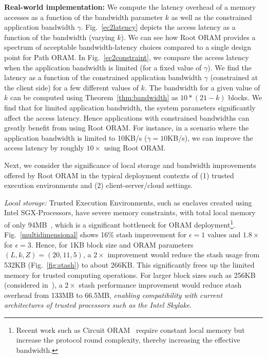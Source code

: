 \documentclass[USenglish,oneside,twocolumn]{article}
\makeatletter
\newcommand{\ourprotocol}{Root ORAM}
\let\origsubsection\subsection
\renewcommand\subsection{\@ifstar{\starsubsection}{\nostarsubsection}}
\newcommand\nostarsubsection[1]
{\subsectionprelude\origsubsection{#1}\subsectionpostlude}
\newcommand\starsubsection[1]
{\subsectionprelude\origsubsection*{#1}\subsectionpostlude}
\newcommand\subsectionprelude{\vspace{-1.5em}}
\newcommand\subsectionpostlude{\vspace{-1em}}
\makeatother
\begin{document}
\textbf{Real-world implementation: } We compute the latency overhead of a memory accesses as a function of the bandwidth parameter $k$ as well as the constrained application bandwidth $\gamma$.
Fig.~\ref{ec2latency} depicts the access latency as a function of the bandwidth (varying $k$). We can see how \ourprotocol{} provides a spectrum of acceptable bandwidth-latency choices compared to a single design point for Path ORAM. In Fig.~\ref{ec2constraint}, we compare the access latency when the application bandwidth is limited (for a fixed value of $\gamma$). We find the latency as a function of the constrained application bandwidth $\gamma$ (constrained at the client side) for a few different values of $k$. The bandwidth for a given value of $k$ can be computed using Theorem~\ref{thm:bandwidth} as $10*(21 - k)$ blocks. We find that for limited application bandwidth, the system parameters significantly affect the access latency. Hence applications with constrained bandwidths can greatly benefit from using \ourprotocol{}. For instance, in a scenario where the application bandwidth is limited to  10KB/s ($\gamma = 10$KB/s), we can improve the access latency by roughly $10\times$ using \ourprotocol{}.


\subsection{Practical Impact}
\label{subsec:usability}



Next, we consider the significance of local storage and bandwidth improvements offered by \ourprotocol{} in the typical deployment contexts of (1) trusted execution environments and (2) client-server/cloud settings. 

\emph{Local storage:} Trusted Execution Environments, such as enclaves created using Intel SGX-Processors, have severe memory constraints, with total local memory of only 94MB~\cite{ohrimenko2016oblivious}, which is a significant bottleneck for ORAM deployment\footnote{Recent work such as Circuit ORAM~\cite{circuitoram} require constant local memory but increase the protocol round complexity, thereby increasing the effective bandwidth.}. Fig.~\ref{multidimensional} shows 16\% stash improvement for $\epsilon = 1$ values and $1.8 \times$ for $\epsilon = 3$. Hence, for 1KB block size and ORAM parameters $(L, k, Z) = (20,11,5)$, a $2 \times$ improvement would reduce the stash usage from 532KB (Fig.~\ref{fig:stash}) to about 266KB. 
This significantly frees up the limited memory for 
trusted computing operations. 
For larger block sizes such as 256KB (considered in~\cite{naveedpractical}), a $2\times$ stash performance improvement would reduce stash overhead from 133MB to 66.5MB, 
\emph{enabling compatibility with current architectures of trusted processors such as the Intel Skylake}.
\end{document}
